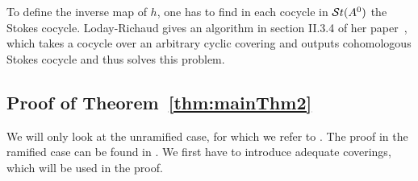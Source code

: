 \begin{comment}
  \marginnote{\cite[880f]{Loday1994}}
  We have also two structures of a linear affine variety on the set $\St(A^0)$.
  \begin{rem}
    Let $\sto_\alpha(A^0)$ be the Lie algebra corresponding to
    $\Sto_\alpha(A^0)$. The exponential map\footnote{This is not the map $\exp$
    from Section~\ref{sec:mainThm1}.} induces an homomorphism
    $\exp:\sto_\alpha(A^0)\to\Sto_\alpha(A^0)$ and denote by $\ln=\exp^{-1}$
    the inverse map.
    \begin{enumerate}
      \item The \emph{tangent linear structure} is defined as \TODO
      \item Using the map
        \begin{align*}
          \sto_{\alpha}(A^0) &\overset{\id+\cdot}\longrightarrow
          \Sto_{\alpha}(A^0)
        \\\dot{f}_\alpha & \longmapsto \id+\dot{f}_\alpha \,.
        \end{align*}
    \end{enumerate}
  \end{rem}
\end{comment}

\begin{rem}
  To define the inverse map of $h$, one has to find in each cocycle in
  $\mathcal{S}{}t(A^0)$ the Stokes cocycle. Loday-Richaud gives an algorithm in section
  II.3.4 of her paper~\cite{Loday1994}, which takes a cocycle over an arbitrary
  cyclic covering and outputs cohomologous Stokes cocycle and thus solves this
  problem.
\end{rem}

\subsection{Proof of Theorem~\ref{thm:mainThm2}}\label{sec:proofOfMatrixThm}
We will only look at the unramified case, for which we refer to
\cite[Sec.II.3]{Loday1994}.
The proof in the ramified case can be found in \cite[Sec.II.4]{Loday1994}.
We first have to introduce adequate coverings, which will be used in the proof.

